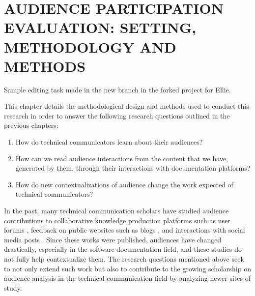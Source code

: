 \chapter{AUDIENCE PARTICIPATION EVALUATION: SETTING, METHODOLOGY AND METHODS}
\label{chap-three}

Sample editing task made in the new branch in the forked project for Ellie.

This chapter details the methodological design and methods used to conduct this research in order to answer the following research questions outlined in the previous chapters:
\begin{enumerate}
  \item How do technical communicators learn about their audiences?
  \item How can we read audience interactions from the content that we have, generated by them, through their interactions with documentation platforms?
  \item How do new contextualizations of audience change the work expected of technical communicators?
\end{enumerate}
In the past, many technical communication scholars have studied audience contributions to collaborative knowledge production platforms such as user forums \cite{swarts2007mobility, frith2017forum}, feedback on public websites such as blogs \cite{gallagher2020update}, and interactions with social media posts \cite{breuch2018involving}. Since these works were published, audiences have changed drastically, especially in the software documentation field, and these studies do not fully help contextualize them. The research questions mentioned above seek to not only extend such work but also to contribute to the growing scholarship on audience analysis in the technical communication field by analyzing newer sites of study.

